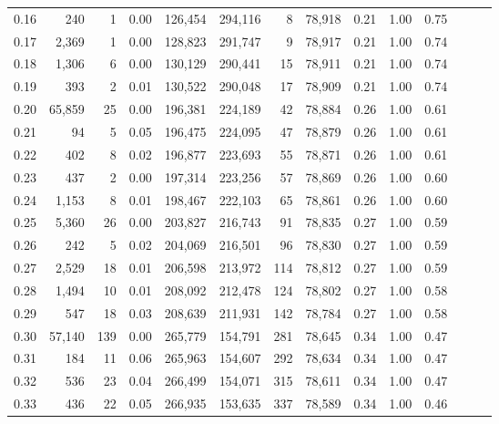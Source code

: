 \begin{tabular}{rrrrrrrrrrrrrr}
0.16 &     240 &       1 &  0.00 &  126,454 &  294,116 &       8 &  78,918 &  0.21 &  1.00 &      0.75 \\
0.17 &   2,369 &       1 &  0.00 &  128,823 &  291,747 &       9 &  78,917 &  0.21 &  1.00 &      0.74 \\
0.18 &   1,306 &       6 &  0.00 &  130,129 &  290,441 &      15 &  78,911 &  0.21 &  1.00 &      0.74 \\
0.19 &     393 &       2 &  0.01 &  130,522 &  290,048 &      17 &  78,909 &  0.21 &  1.00 &      0.74 \\
0.20 &  65,859 &      25 &  0.00 &  196,381 &  224,189 &      42 &  78,884 &  0.26 &  1.00 &      0.61 \\
0.21 &      94 &       5 &  0.05 &  196,475 &  224,095 &      47 &  78,879 &  0.26 &  1.00 &      0.61 \\
0.22 &     402 &       8 &  0.02 &  196,877 &  223,693 &      55 &  78,871 &  0.26 &  1.00 &      0.61 \\
0.23 &     437 &       2 &  0.00 &  197,314 &  223,256 &      57 &  78,869 &  0.26 &  1.00 &      0.60 \\
0.24 &   1,153 &       8 &  0.01 &  198,467 &  222,103 &      65 &  78,861 &  0.26 &  1.00 &      0.60 \\
0.25 &   5,360 &      26 &  0.00 &  203,827 &  216,743 &      91 &  78,835 &  0.27 &  1.00 &      0.59 \\
0.26 &     242 &       5 &  0.02 &  204,069 &  216,501 &      96 &  78,830 &  0.27 &  1.00 &      0.59 \\
0.27 &   2,529 &      18 &  0.01 &  206,598 &  213,972 &     114 &  78,812 &  0.27 &  1.00 &      0.59 \\
0.28 &   1,494 &      10 &  0.01 &  208,092 &  212,478 &     124 &  78,802 &  0.27 &  1.00 &      0.58 \\
0.29 &     547 &      18 &  0.03 &  208,639 &  211,931 &     142 &  78,784 &  0.27 &  1.00 &      0.58 \\
0.30 &  57,140 &     139 &  0.00 &  265,779 &  154,791 &     281 &  78,645 &  0.34 &  1.00 &      0.47 \\
0.31 &     184 &      11 &  0.06 &  265,963 &  154,607 &     292 &  78,634 &  0.34 &  1.00 &      0.47 \\
0.32 &     536 &      23 &  0.04 &  266,499 &  154,071 &     315 &  78,611 &  0.34 &  1.00 &      0.47 \\
0.33 &     436 &      22 &  0.05 &  266,935 &  153,635 &     337 &  78,589 &  0.34 &  1.00 &      0.46 \\

\end{tabular}
